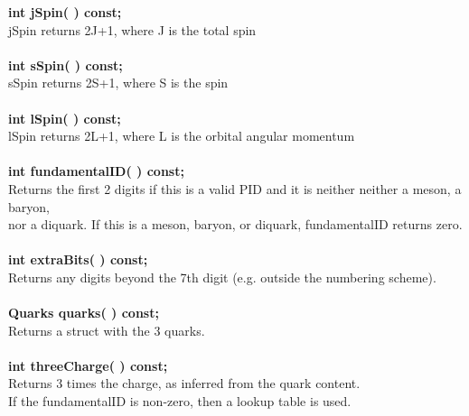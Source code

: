 \documentclass[twoside,12pt]{article}
\begin{document}
\begin{tabbing}
\hspace{0.5in}  {\bf int  jSpin( )        const; }\\
\hspace{0.5in}  jSpin returns 2J+1, where J is the total spin \\ \\
\hspace{0.5in}  {\bf int  sSpin( )        const; }\\
\hspace{0.5in}  sSpin returns 2S+1, where S is the spin \\ \\
\hspace{0.5in}  {\bf int  lSpin( )        const; }\\
\hspace{0.5in}  lSpin returns 2L+1, where L is the orbital angular momentum \\ \\
\hspace{0.5in}  {\bf int fundamentalID( ) const; }\\
\hspace{0.5in}  Returns the first 2 digits if this is a valid PID and it is neither
                neither a meson, a baryon, \\
\hspace{0.5in}	nor a diquark.  If this is a meson, baryon, or
		diquark, fundamentalID returns zero. \\ \\
\hspace{0.5in}  {\bf int extraBits( ) const; }\\
\hspace{0.5in}  Returns any digits beyond the 7th digit 
                (e.g. outside the numbering scheme). \\ \\
\hspace{0.5in}  {\bf Quarks quarks( ) const; }\\
\hspace{0.5in}  Returns a struct with the 3 quarks. \\ \\
\hspace{0.5in}  {\bf int threeCharge( ) const; }\\
\hspace{0.5in}  Returns 3 times the charge, as inferred from the quark content.\\
\hspace{0.5in}  If the fundamentalID is non-zero, then a lookup table is used. \\ \\

\end{tabbing}
\end{document}
